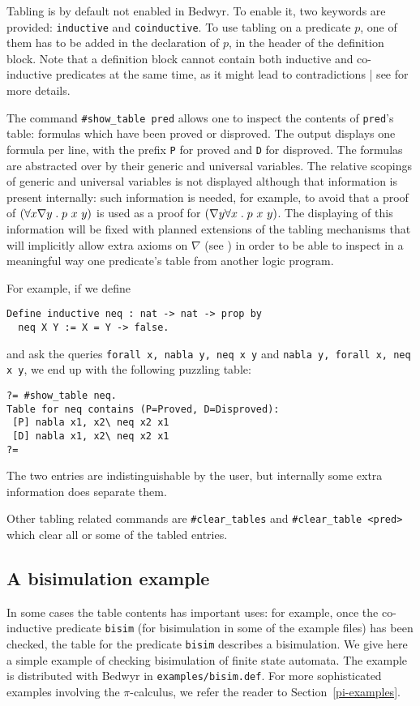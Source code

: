 Tabling is by default not enabled in Bedwyr. To enable it, two keywords
are provided: \texttt{inductive} and \texttt{coinductive}.
To use tabling on a predicate $p$, one of them has to be added in the
declaration of $p$, in the header of the definition block.
Note that a definition block cannot contain both inductive and
co-inductive predicates at the same time, as it might lead to
contradictions | see \cite{momigliano03types} for more details.

The command \verb/#show_table pred/ allows one to inspect the contents of
\verb.pred.'s table: formulas which have been proved or disproved. The
output displays one formula per line, with the prefix \verb.P. for
proved and \verb.D. for disproved. The formulas are abstracted over by
their generic and universal variables. The relative scopings of generic
and universal variables is not displayed although that information is
present internally: such information is needed, for example, to avoid
that a proof of $(\forall x\nabla y\; . \; p~x~y)$ is used as a proof for
$(\nabla y\forall x\; . \; p~x~y)$.  The displaying of this information will
be fixed with planned extensions of the tabling mechanisms that will
implicitly allow extra axioms on $\nabla$ (see \cite{tiu06lfmtp}) in
order to be able to inspect in a meaningful way one predicate's table
from another logic program.

For example, if we define
\begin{verbatim}
Define inductive neq : nat -> nat -> prop by
  neq X Y := X = Y -> false.
\end{verbatim}
and ask the queries \texttt{forall x, nabla y, neq x y}
and \texttt{nabla y, forall x, neq x y}, we end up with the following
puzzling table:
\begin{verbatim}
?= #show_table neq.
Table for neq contains (P=Proved, D=Disproved):
 [P] nabla x1, x2\ neq x2 x1
 [D] nabla x1, x2\ neq x2 x1
?=
\end{verbatim}
The two entries are indistinguishable by the user, but internally some
extra information does separate them.

Other tabling related commands are \verb/#clear_tables/ and
\verb/#clear_table <pred>/ which clear all or some of the tabled entries.

\subsection{A bisimulation example}

In some cases the table contents has important uses: for
example, once the co-inductive predicate {\tt bisim} (for bisimulation
in some of the example files) has been checked, the table for the
predicate {\tt bisim} describes a bisimulation.
We give here a simple example of checking bisimulation of finite
state automata.
The example is distributed with Bedwyr in \verb+examples/bisim.def+.
For more sophisticated examples involving the $\pi$-calculus,
we refer the reader to Section~\ref{pi-examples}.

